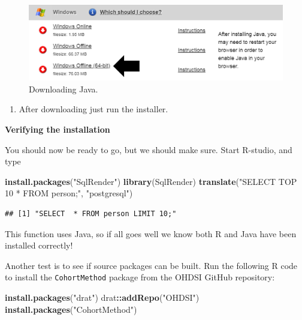 \documentclass[11pt]{book}
\newenvironment{Shaded}{\begin{snugshade}}{\end{snugshade}}
\newcommand{\KeywordTok}[1]{\textcolor[rgb]{0.13,0.29,0.53}{\textbf{#1}}}
\newcommand{\StringTok}[1]{\textcolor[rgb]{0.31,0.60,0.02}{#1}}
\newcommand{\OperatorTok}[1]{\textcolor[rgb]{0.81,0.36,0.00}{\textbf{#1}}}
\newcommand{\NormalTok}[1]{#1}
\providecommand{\tightlist}{%
  \setlength{\itemsep}{0pt}\setlength{\parskip}{0pt}}
\begin{document}
\begin{figure}

{\centering \includegraphics[width=1\linewidth]{images/OhdsiAnalyticsTools/downloadJava} 

}

\caption{Downloading Java.}\label{fig:downloadJava}
\end{figure}

\begin{enumerate}
\def\labelenumi{\arabic{enumi}.}
\setcounter{enumi}{1}
\tightlist
\item
  After downloading just run the installer.
\end{enumerate}

\textbf{Verifying the installation}

You should now be ready to go, but we should make sure. Start R-studio,
and type

\begin{Shaded}
\begin{Highlighting}[]
\KeywordTok{install.packages}\NormalTok{(}\StringTok{"SqlRender"}\NormalTok{)}
\KeywordTok{library}\NormalTok{(SqlRender)}
\KeywordTok{translate}\NormalTok{(}\StringTok{"SELECT TOP 10 * FROM person;"}\NormalTok{, }\StringTok{"postgresql"}\NormalTok{)}
\end{Highlighting}
\end{Shaded}

\begin{verbatim}
## [1] "SELECT  * FROM person LIMIT 10;"
\end{verbatim}

This function uses Java, so if all goes well we know both R and Java
have been installed correctly!

Another test is to see if source packages can be built. Run the
following R code to install the \texttt{CohortMethod} package from the
OHDSI GitHub repository:

\begin{Shaded}
\begin{Highlighting}[]
\KeywordTok{install.packages}\NormalTok{(}\StringTok{"drat"}\NormalTok{)}
\NormalTok{drat}\OperatorTok{::}\KeywordTok{addRepo}\NormalTok{(}\StringTok{"OHDSI"}\NormalTok{)}
\KeywordTok{install.packages}\NormalTok{(}\StringTok{"CohortMethod"}\NormalTok{)}
\end{Highlighting}
\end{Shaded}
\end{document}
